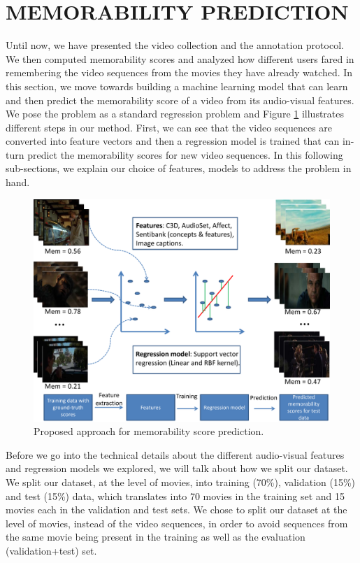 \documentclass[sigconf]{acmart}
\begin{document}
\section{MEMORABILITY PREDICTION} %

Until now, we have presented the video collection and the annotation protocol. 
We then computed memorability scores and analyzed how different users fared in remembering the video sequences from the movies they have already watched.
In this section, we move towards building a machine learning model that can learn and then predict the memorability score of a video from its audio-visual features. 
We pose the problem as a standard regression problem and Figure \ref{prop-apprch} illustrates different steps in our method.
First, we can see that the video sequences are converted into feature vectors and then a regression model is trained that can in-turn predict the memorability scores for new video sequences.
In this following sub-sections, we explain our choice of features, models to address the problem in hand.

\begin{figure}[h]	  
  \centering
    \includegraphics[width=0.9\columnwidth]{figures/approach.pdf}
		\caption{Proposed approach for memorability score prediction.}
    \label{prop-apprch}
\end{figure}

Before we go into the technical details about the different audio-visual features and regression models we explored, we will talk about how we split our dataset.
We split our dataset, at the level of movies, into training (70\%), validation (15\%) and test (15\%) data, which translates into 70 movies in the training set and 15 movies each in the validation and test sets.
We chose to split our dataset at the level of movies, instead of the video sequences, in order to avoid sequences from the same movie being present in the training as well as the evaluation (validation+test) set.
\end{document}
